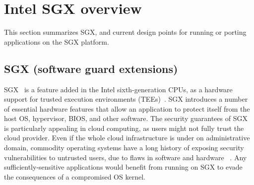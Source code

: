 
\section{Intel SGX overview}
\label{sec:sgx:overview}

This section summarizes SGX,
and current design points for running or porting applications on the SGX platform.


\subsection{SGX (software guard extensions)}
\label{sec:sgx:background:sgx}


SGX~\cite{intelsgx} is a feature added in the Intel sixth-generation CPUs,
as a hardware support for trusted execution environments (TEEs)~\cite{santos09tccp,lie2003implementing,trustzone,amd-sme}.
SGX introduces a number of essential hardware features that allow an application
to protect itself from the host OS, hypervisor, BIOS, and other software.
The security guarantees of SGX is particularly appealing in cloud computing, as users 
might not fully trust the cloud provider.
Even if the whole cloud infrastructure
is under on administrative domain,
commodity operating systems have a long history of exposing security vulnerabilities
to untrusted users, due to 
flaws in software and hardware
~\cite{arbaugh00vulnerability,dirtycow,xu15ccs,liu15llc-attack,kim14rowhammer}.
Any sufficiently-sensitive applications
would benefit from running on SGX to evade the consequences of a compromised OS kernel.


